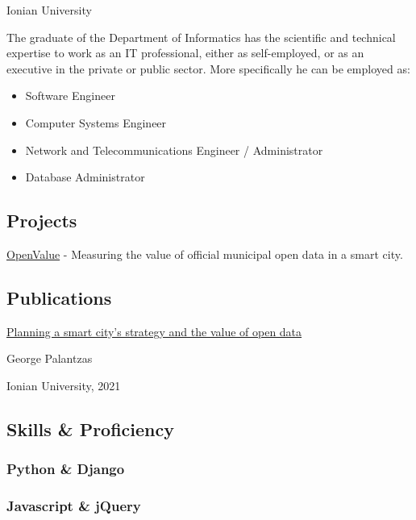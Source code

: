 \documentclass[english,]{article}
\providecommand{\tightlist}{%
  \setlength{\itemsep}{0pt}\setlength{\parskip}{0pt}}
\begin{document}
Ionian University

The graduate of the Department of Informatics has the scientific and
technical expertise to work as an IT professional, either as
self-employed, or as an executive in the private or public sector. More
specifically he can be employed as:

\begin{itemize}
\tightlist
\item
  Software Engineer
\item
  Computer Systems Engineer
\item
  Network and Telecommunications Engineer / Administrator
\item
  Database Administrator
\end{itemize}

\hypertarget{projects}{%
\subsection{\texorpdfstring{{ \emph{} \emph{} }
Projects}{    Projects}}\label{projects}}

{ \protect\hyperlink{hook}{OpenValue} } - {Measuring the value of
official municipal open data in a smart city.}

\hypertarget{publications}{%
\subsection{\texorpdfstring{{ \emph{} \emph{} }
Publications}{    Publications}}\label{publications}}

\protect\hyperlink{}{Planning a smart city's strategy and the value of
open data}

George Palantzas

Ionian University, 2021

\hypertarget{skills-proficiency}{%
\subsection{\texorpdfstring{{ \emph{} \emph{} } Skills \&
Proficiency}{    Skills \& Proficiency}}\label{skills-proficiency}}

\hypertarget{python-django}{%
\subsubsection{Python \& Django}\label{python-django}}

\hypertarget{javascript-jquery}{%
\subsubsection{Javascript \& jQuery}\label{javascript-jquery}}
\end{document}
